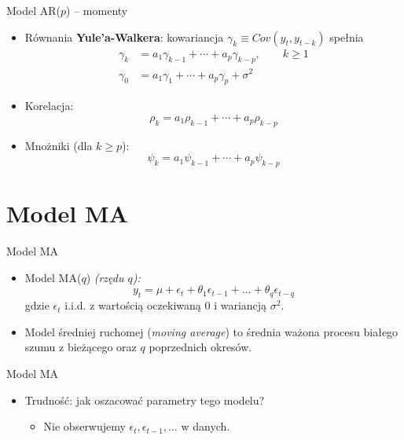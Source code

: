 \documentclass[11pt,usenames,dvipsnames,aspectratio=169]{beamer}
\begin{document}
\begin{frame}{Model AR($p$) -- momenty}
\begin{itemize}
    \item Równania \textbf{Yule'a-Walkera}: kowariancja $\gamma_{k}\equiv Cov(y_{t},y_{t-k})$ spełnia
    \begin{align*}
    \gamma_{k} & =a_{1}\gamma_{k-1}+\cdots+a_{p}\gamma_{k-p}, \qquad k\geq 1\\
    \gamma_{0} & =a_{1}\gamma_{1}+\cdots+a_{p}\gamma_{p}+\sigma^{2}
    \end{align*}
    \item Korelacja:
    \[
    \rho_{k}=a_{1}\rho_{k-1}+\cdots+a_{p}\rho_{k-p}
    \]
    \item Mnożniki (dla $k\geq p$):
    \[
    \psi_{k}=a_{1}\psi_{k-1}+\cdots+a_{p}\psi_{k-p}
    \]
\end{itemize}
\end{frame}

\section{Model MA}

\begin{frame}{Model MA}
\begin{itemize}
    \item Model MA($q$) \emph{(rzędu $q$):}
    \[
    y_{t}=\mu+\epsilon_{t}+\theta_{1}\epsilon_{t-1}+\ldots+\theta_{q}\epsilon_{t-q}
    \]
    gdzie $\epsilon_{t}$ i.i.d. z wartością oczekiwaną $0$ i wariancją $\sigma^{2}$.
    \item Model średniej ruchomej (\emph{moving average}) to średnia ważona procesu białego szumu z bieżącego oraz $q$ poprzednich okresów.
\end{itemize}
\end{frame}

\begin{frame}{Model MA}
\begin{itemize}
    \item Trudność: jak oszacować parametry tego modelu?
    \begin{itemize}
        \item Nie obserwujemy $\epsilon_{t},\epsilon_{t-1},\ldots$ w danych.
    \end{itemize}
\end{itemize}
\end{frame}
\end{document}
